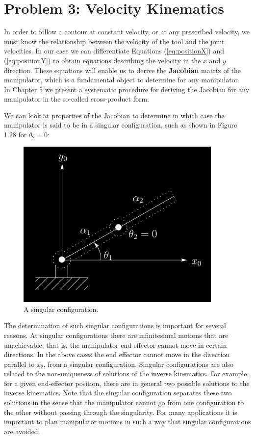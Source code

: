 \section*{Problem 3: Velocity Kinematics} \label{Sec: Problem 3: Velocity Kinematics}


	In order to follow a contour at constant velocity, or at any prescribed velocity, we must
	know the relationship between the velocity of the tool and the joint velocities.
	In our case we can differentiate Equations (\ref{eq:positionX}) and (\ref{eq:positionY}) to obtain equations describing
	the velocity in the $x$ and $y$ direction. These equations will enable us to derive the \textbf{Jacobian} matrix of the manipulator,
	which is a fundamental object to determine for any manipulator.\\
	In Chapter 5 we present a systematic procedure for deriving the Jacobian for any manipulator in the so-called cross-product form.

	We can look at properties of the Jacobian to determine in which case the manipulator is said to be in a singular configuration,
	such as shown in Figure 1.28 for $\theta_2 = 0$:

	\begin{figure}[H]
		\centering
		\includegraphics[width=0.9\textwidth]{img/Figure1_28.png}
		\caption{A singular configuration.}
		\label{fig:Figure1_28}
	\end{figure}

	The determination of such singular configurations is important for several reasons.
	At singular configurations there are infinitesimal motions that are unachievable; that is, the manipulator end-effector cannot move in certain directions.
	In the above cases the end effector cannot move in the direction parallel to $x_{2}$, from a singular configuration.
	Singular configurations are also related to the non-uniqueness of solutions of the inverse kinematics.
	For example, for a given end-effector position, there are in general two possible solutions to the inverse kinematics.
	Note that the singular configuration separates these two solutions in the sense that the manipulator cannot go from one
	configuration to the other without passing through the singularity.
	For many applications it is important to plan manipulator motions in such a way that singular configurations are avoided.
